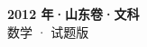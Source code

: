 \documentclass[zihao=-4, a4paper]{ctexart}
\begin{document}
\begin{center}
  {\Large\bfseries 2012 年·山东卷·文科}\\[4pt]
  {\large 数学 · 试题版}
\end{center}
\medskip
{}

\end{document}
